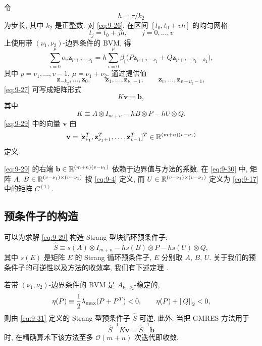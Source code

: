 令
\[
  h=\tau/k_2
\]
为步长, 其中 $k_2$ 是正整数. 对 \eqref{eq:9-26}, 在区间 $[t_0,t_0+vh]$ 的均匀网格
\[
  t_j=t_0+jh,\qquad j=0,\ldots,v
\]
上使用带 $(\nu_1,\nu_2)$-边界条件的 BVM, 得
\begin{equation}
  \sum_{i=0}^{\mu}\alpha_i\mathbf{z}_{p+i-\nu_1}
  =h\sum_{i=0}^{\mu}\beta_i\bigl(P\mathbf{z}_{p+i-\nu_1}
  +Q\mathbf{z}_{p+i-\nu_1-k_2}\bigr),
  \label{eq:9-27}
\end{equation}
其中 $p=\nu_1,\ldots,v-1$, $\mu=\nu_1+\nu_2$. 通过提供值
\begin{equation}
  \mathbf{z}_{-k_2},\ldots,\mathbf{z}_0,\qquad
  \mathbf{z}_1,\ldots,\mathbf{z}_{\nu_1-1},\qquad
  \mathbf{z}_{v},\ldots,\mathbf{z}_{v+\nu_2-1},
  \label{eq:9-28}
\end{equation}
\eqref{eq:9-27} 可写成矩阵形式
\begin{equation}
  K\mathbf{v}=\mathbf{b},
  \label{eq:9-29}
\end{equation}
其中
\begin{equation}
  K\equiv A\otimes I_{m+n}-hB\otimes P-hU\otimes Q.
  \label{eq:9-30}
\end{equation}
\eqref{eq:9-29} 中的向量 $\mathbf{v}$ 由
\[
  \mathbf{v}=[\mathbf{z}_{\nu_1}^T,\mathbf{z}_{\nu_1+1}^T,\ldots,
  \mathbf{z}_{v-1}^T]^T\in\mathbb{R}^{(m+n)(v-\nu_1)}
\]
定义.

\eqref{eq:9-29} 的右端 $\mathbf{b}\in\mathbb{R}^{(m+n)(v-\nu_1)}$ 依赖于边界值与方法的系数. 在 \eqref{eq:9-30} 中, 矩阵 $A$, $B\in\mathbb{R}^{(v-\nu_1)\times(v-\nu_1)}$ 按 \eqref{eq:9-4} 定义, 而 $U\in\mathbb{R}^{(v-\nu_1)\times(v-\nu_1)}$ 定义为 \eqref{eq:9-17} 中的矩阵 $C^{(1)}$.

\subsection{预条件子的构造}
\label{sec:9-6-2}

可以为求解 \eqref{eq:9-29} 构造 Strang 型块循环预条件子:
\begin{equation}
  \widehat{S}\equiv s(A)\otimes I_{m+n}-hs(B)\otimes P-hs(U)\otimes Q,
  \label{eq:9-31}
\end{equation}
其中 $s(E)$ 是矩阵 $E$ 的 Strang 循环预条件子, $E$ 分别取 $A$, $B$, $U$. 关于我们的预条件子的可逆性以及方法的收敛率, 我们有下述定理 \cite{src:45}.

\begin{theorem}
\label{thm:9-7}
若带 $(\nu_1,\nu_2)$-边界条件的 BVM 是 $A_{\nu_1,\nu_2}$-稳定的,
\[
  \eta(P)\equiv\frac{1}{2}\lambda_{\max}(P+P^T)<0,\qquad
  \eta(P)+\left\|Q\right\|_2<0,
\]
则由 \eqref{eq:9-31} 定义的 Strang 型预条件子 $\widehat{S}$ 可逆. 此外, 当把 GMRES 方法用于
\[
  \widehat{S}^{-1}K\mathbf{v}=\widehat{S}^{-1}\mathbf{b}
\]
时, 在精确算术下该方法至多 $\mathcal{O}(m+n)$ 次迭代即收敛.
\end{theorem}

